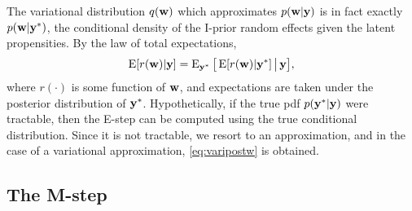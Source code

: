 \begin{remark}
  The variational distribution $q({\mathbf w})$ which approximates $p({\mathbf w}|{\mathbf y})$ is in fact exactly $p({\mathbf w}|{\mathbf y}^*)$, the conditional density of the I-prior random effects given the latent propensities.
  By the law of total expectations, 
  \begin{gather*}
    \operatorname{E}[r({\mathbf w})|{\mathbf y}] = \operatorname{E}_{{\mathbf y}^*}\big[ \operatorname{E}[r({\mathbf w})|{\mathbf y}^*] \,\big|\, {\mathbf y} \big],
  \end{gather*}
  where $r(\cdot)$ is some function of ${\mathbf w}$, and expectations are taken under the posterior distribution of ${\mathbf y}^*$.
  Hypothetically, if the true pdf $p({\mathbf y}^*|{\mathbf y})$ were tractable,  then the E-step can be computed using the true conditional distribution.
  Since it is not tractable, we resort to an approximation, and in the case of a variational approximation, \cref{eq:varipostw} is obtained.
\end{remark}

\subsection{The M-step}
\label{sec:varupdeta}


